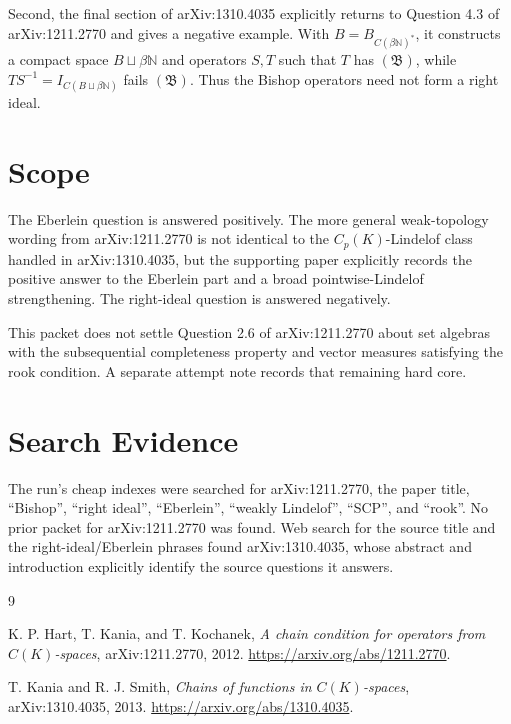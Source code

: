 \documentclass[11pt]{article}
\newcommand{\bishop}{\mathfrak{B}}
\begin{document}
Second, the final section of arXiv:1310.4035 explicitly returns to Question 4.3
of arXiv:1211.2770 and gives a negative example.  With
\(B=B_{C(\beta\mathbb N)^*}\), it constructs a compact space
\(B\sqcup\beta\mathbb N\) and operators \(S,T\) such that \(T\) has
\((\bishop)\), while \(TS^{-1}=I_{C(B\sqcup\beta\mathbb N)}\) fails
\((\bishop)\).  Thus the Bishop operators need not form a right ideal.

\section*{Scope}

The Eberlein question is answered positively.  The more general weak-topology
wording from arXiv:1211.2770 is not identical to the \(C_p(K)\)-Lindelof class
handled in arXiv:1310.4035, but the supporting paper explicitly records the
positive answer to the Eberlein part and a broad pointwise-Lindelof strengthening.
The right-ideal question is answered negatively.

This packet does not settle Question 2.6 of arXiv:1211.2770 about set algebras
with the subsequential completeness property and vector measures satisfying the
rook condition.  A separate attempt note records that remaining hard core.

\section*{Search Evidence}

The run's cheap indexes were searched for arXiv:1211.2770, the paper title,
``Bishop'', ``right ideal'', ``Eberlein'', ``weakly Lindelof'', ``SCP'', and
``rook''.  No prior packet for arXiv:1211.2770 was found.  Web search for the
source title and the right-ideal/Eberlein phrases found arXiv:1310.4035, whose
abstract and introduction explicitly identify the source questions it answers.

\begin{thebibliography}{9}

K. P. Hart, T. Kania, and T. Kochanek,
\emph{A chain condition for operators from \(C(K)\)-spaces},
arXiv:1211.2770, 2012.
\url{https://arxiv.org/abs/1211.2770}.

T. Kania and R. J. Smith,
\emph{Chains of functions in \(C(K)\)-spaces},
arXiv:1310.4035, 2013.
\url{https://arxiv.org/abs/1310.4035}.

\end{thebibliography}
\end{document}
